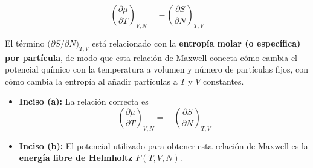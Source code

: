 \documentclass{article}
\begin{document}
\begin{equation}
\boxed{
\left(\frac{\partial \mu}{\partial T}\right)_{V,N}
=
-\,\left(\frac{\partial S}{\partial N}\right)_{T,V}
}
\label{eq:P4_Maxwell_final}
\end{equation}

El término \(\big(\partial S/\partial N\big)_{T,V}\) está relacionado con la
\textcolor{vividviolet}{\textbf{entropía molar (o específica) por partícula}}, de modo que esta
relación de Maxwell conecta cómo cambia el potencial químico con la temperatura
a volumen y número de partículas fijos, con cómo cambia la entropía al añadir
partículas a \(T\) y \(V\) constantes.

\vspace{0.3cm}

\begin{itemize}
  \item[$\bullet$] \textcolor{Cinnabar}{\textbf{Inciso (a):}}  
  La relación correcta es
  \[
  \left(\frac{\partial \mu}{\partial T}\right)_{V,N}
  = -\,\left(\frac{\partial S}{\partial N}\right)_{T,V}
  \]

  \item[$\bullet$] \textcolor{orange(colorwheel)}{\textbf{Inciso (b):}}  
  El potencial utilizado para obtener esta relación de Maxwell es la
  \textcolor{Tarawera}{\textbf{energía libre de Helmholtz}} \(F(T,V,N)\).
\end{itemize}
\end{document}
